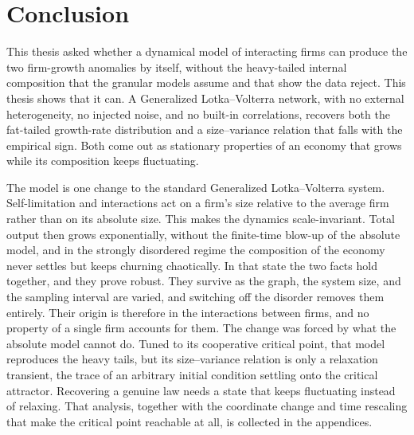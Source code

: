 \chapter{Conclusion}
\label{chap:conclusion}

This thesis asked whether a dynamical model of interacting firms can produce the two
firm-growth anomalies by itself, without the heavy-tailed internal composition that the
granular models assume and that \citet{moran2024} show the data reject. This thesis shows
that it can. A Generalized Lotka--Volterra network, with no external heterogeneity, no injected
noise, and no built-in correlations, recovers both the fat-tailed growth-rate distribution and a
size--variance relation that falls with the empirical sign. Both come out as stationary
properties of an economy that grows while its composition keeps fluctuating.

The model is one change to the standard Generalized Lotka--Volterra system.
Self-limitation and interactions act on a firm's size relative to the average firm rather
than on its absolute size. This makes the dynamics scale-invariant. Total output then grows
exponentially, without the finite-time blow-up of the absolute model, and in the strongly
disordered regime the composition of the economy never settles but keeps churning
chaotically. In that state the two facts hold together, and they prove robust. They
survive as the graph, the system size, and the sampling interval are varied, and
switching off the disorder removes them entirely. Their origin is therefore in the
interactions between firms, and no property of a single firm accounts for them. The change was forced by what the
absolute model cannot do. Tuned to its cooperative critical point, that model reproduces
the heavy tails, but its size--variance relation is only a relaxation transient, the trace
of an arbitrary initial condition settling onto the critical attractor. Recovering a genuine law needs a state that keeps fluctuating instead of relaxing.
That analysis, together with the coordinate change and time rescaling that make the
critical point reachable at all, is collected in the appendices.

